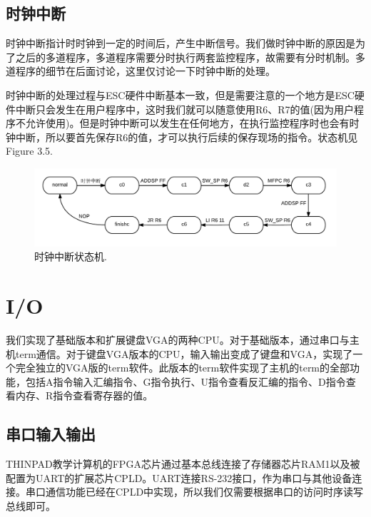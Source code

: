 \subsection{时钟中断}

时钟中断指计时时钟到一定的时间后，产生中断信号。我们做时钟中断的原因是为了之后的多道程序，多道程序需要分时执行两套监控程序，故需要有分时机制。多道程序的细节在后面讨论，这里仅讨论一下时钟中断的处理。

时钟中断的处理过程与ESC硬件中断基本一致，但是需要注意的一个地方是ESC硬件中断只会发生在用户程序中，这时我们就可以随意使用R6、R7的值(因为用户程序不允许使用)。但是时钟中断可以发生在任何地方，在执行监控程序时也会有时钟中断，所以要首先保存R6的值，才可以执行后续的保存现场的指令。状态机见Figure 3.5.

\begin{figure}[H]
  \includegraphics[width=\linewidth]{Figures/clock.png}
  \caption{时钟中断状态机.}
\end{figure}




\section{I/O}

我们实现了基础版本和扩展键盘VGA的两种CPU。对于基础版本，通过串口与主机term通信。对于键盘VGA版本的CPU，输入输出变成了键盘和VGA，实现了一个完全独立的VGA版的term软件。此版本的term软件实现了主机的term的全部功能，包括A指令输入汇编指令、G指令执行、U指令查看反汇编的指令、D指令查看内存、R指令查看寄存器的值。

\subsection{串口输入输出}

THINPAD教学计算机的FPGA芯片通过基本总线连接了存储器芯片RAM1以及被配置为UART的扩展芯片CPLD。UART连接RS-232接口，作为串口与其他设备连接。串口通信功能已经在CPLD中实现，所以我们仅需要根据串口的访问时序读写总线即可。

